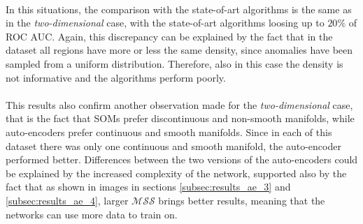 \paragraph{}
In this situations, the comparison with the state-of-art algorithms is the same as in the \textit{two-dimensional} case, with the state-of-art algorithms loosing up to $20\%$ of ROC AUC. \newline
Again, this discrepancy can be explained by the fact that in the dataset all regions have more or less the same density, since anomalies have been sampled from a uniform distribution. Therefore, also in this case the density is not informative and the algorithms perform poorly.

\paragraph{}
This results also confirm another observation made for the \textit{two-dimensional} case, that is the fact that SOMs prefer discontinuous and non-smooth manifolds, while auto-encoders prefer continuous and smooth manifolds. Since in each of this dataset there was only one continuous and smooth manifold, the auto-encoder performed better. \newline
Differences between the two versions of the auto-encoders could be explained by the increased complexity of the network, supported also by the fact that as shown in images in sections \ref{subsec:results_ae_3} and \ref{subsec:results_ae_4}, larger $\mathcal{MSS}$ brings better results, meaning that the networks can use more data to train on.